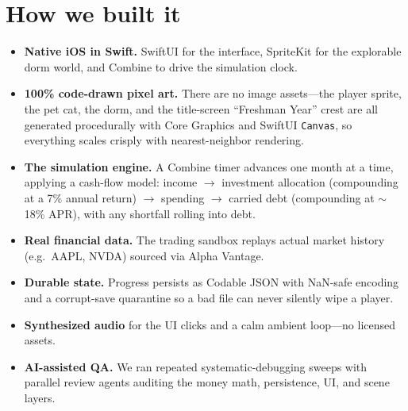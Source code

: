 \documentclass[11pt]{article}
\begin{document}
\section*{How we built it}
\begin{itemize}
  \item \textbf{Native iOS in Swift.} SwiftUI for the interface, SpriteKit for the
  explorable dorm world, and Combine to drive the simulation clock.
  \item \textbf{100\% code-drawn pixel art.} There are no image assets---the player
  sprite, the pet cat, the dorm, and the title-screen ``Freshman Year'' crest are all
  generated procedurally with Core Graphics and SwiftUI \texttt{Canvas}, so everything
  scales crisply with nearest-neighbor rendering.
  \item \textbf{The simulation engine.} A Combine timer advances one month at a time,
  applying a cash-flow model: income $\rightarrow$ investment allocation (compounding at
  a 7\% annual return) $\rightarrow$ spending $\rightarrow$ carried debt (compounding at
  $\sim$18\% APR), with any shortfall rolling into debt.
  \item \textbf{Real financial data.} The trading sandbox replays actual market history
  (e.g.\ AAPL, NVDA) sourced via Alpha Vantage.
  \item \textbf{Durable state.} Progress persists as Codable JSON with NaN-safe encoding
  and a corrupt-save quarantine so a bad file can never silently wipe a player.
  \item \textbf{Synthesized audio} for the UI clicks and a calm ambient loop---no
  licensed assets.
  \item \textbf{AI-assisted QA.} We ran repeated systematic-debugging sweeps with
  parallel review agents auditing the money math, persistence, UI, and scene layers.
\end{itemize}
\end{document}
